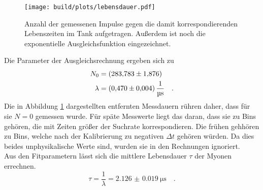 \begin{figure}[H]
  \centering
  \texttt{[image: build/plots/lebensdauer.pdf]}
  \caption{Anzahl der gemessenen Impulse gegen die damit korrespondierenden Lebenszeiten im Tank aufgetragen. Außerdem ist noch die exponentielle Ausgleichsfunktion eingezeichnet.}
  \label{img:lebensdauer}
\end{figure}
\noindent
Die Parameter der Ausgleichsrechnung ergeben sich zu
\begin{align*}
  N_0    &=\SI{283.783 (1876)}{} \\
  \lambda&=\SI{0.470(0004)}{\per\micro\second} \quad .
\end{align*}
Die in Abbildung \ref{img:lebensdauer} dargestellten entfernten Messdauern rühren daher, dass für sie $N=0$ gemessen wurde.
Für späte Messwerte liegt das daran, dass sie zu Bins gehören, die mit Zeiten größer der Suchrate korrespondieren. 
Die frühen gehhören zu Bins, welche nach der Kalibrierung zu negativen $\Delta t$ gehören würden.  
Da dies beides unphysikalische Werte sind, wurden sie in den Rechnungen ignoriert.\\
Aus den Fitparametern lässt sich die mittlere Lebensdauer $\tau$ der Myonen errechnen.
\begin{equation*}
  \tau= \frac{1}{\lambda} = \SI{2.126(0019)}{\micro\second} \quad .
\end{equation*}
